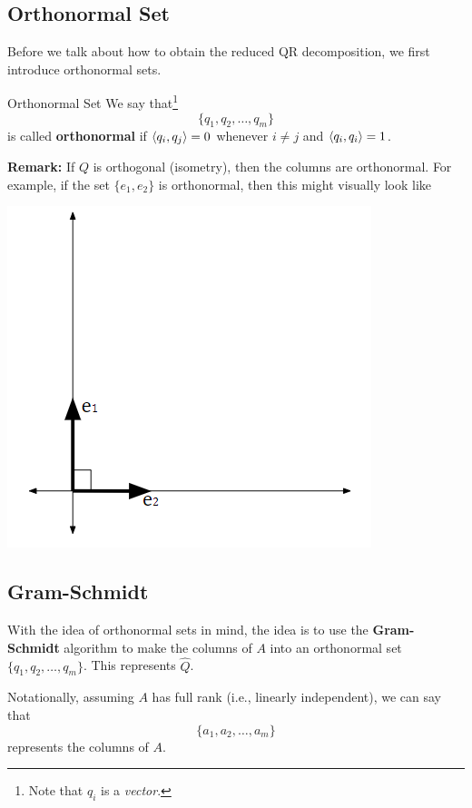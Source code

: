 \documentclass[letterpaper]{article}
\newcommand{\0}{\mathbf{0}}
\begin{document}
\subsection{Orthonormal Set}
Before we talk about how to obtain the reduced QR decomposition, we first introduce orthonormal sets. 
\begin{definition}{Orthonormal Set}{}
    We say that\footnote{Note that $q_i$ is a \emph{vector}.}
    \[\{q_1, q_2, \hdots, q_m\}\]
    is called \textbf{orthonormal} if $\langle q_i, q_j \rangle = 0$ whenever $i \neq j$ and $\langle q_i, q_i \rangle = 1$.
\end{definition}
\textbf{Remark:} If $Q$ is orthogonal (isometry), then the columns are orthonormal. For example, if the set $\{e_1, e_2\}$ is orthonormal, then this might visually look like 
\begin{center}
    \includegraphics[scale=0.7]{assets/orthonormal.png}
\end{center}

\subsection{Gram-Schmidt}
With the idea of orthonormal sets in mind, the idea is to use the \textbf{Gram-Schmidt} algorithm to make the columns of $A$ into an orthonormal set $\{q_1, q_2, \hdots, q_m\}$. This represents $\hat{Q}$. 

\bigskip 

Notationally, assuming $A$ has full rank (i.e., linearly independent), we can say that \[\{a_1, a_2, \hdots, a_m\}\] represents the columns of $A$. 
\end{document}
